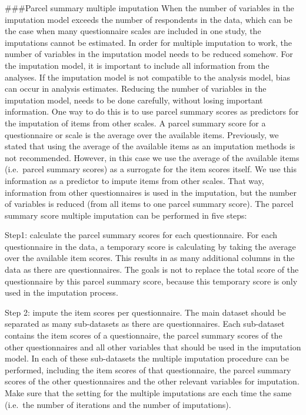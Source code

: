 \documentclass[
]{book}
\begin{document}
\#\#\#Parcel summary multiple imputation
When the number of variables in the imputation model exceeds the number of respondents in the data, which can be the case when many questionnaire scales are included in one study, the imputations cannot be estimated. In order for multiple imputation to work, the number of variables in the imputation model needs to be reduced somehow. For the imputation model, it is important to include all information from the analyses. If the imputation model is not compatible to the analysis model, bias can occur in analysis estimates. Reducing the number of variables in the imputation model, needs to be done carefully, without losing important information. One way to do this is to use parcel summary scores as predictors for the imputation of items from other scales. A parcel summary score for a questionnaire or scale is the average over the available items. Previously, we stated that using the average of the available items as an imputation methods is not recommended. However, in this case we use the average of the available items (i.e.~parcel summary scores) as a surrogate for the item scores itself. We use this information as a predictor to impute items from other scales. That way, information from other questionnaires is used in the imputation, but the number of variables is reduced (from all items to one parcel summary score). The parcel summary score multiple imputation can be performed in five steps:

Step1: calculate the parcel summary scores for each questionnaire. For each questionnaire in the data, a temporary score is calculating by taking the average over the available item scores. This results in as many additional columns in the data as there are questionnaires. The goals is not to replace the total score of the questionnaire by this parcel summary score, because this temporary score is only used in the imputation process.

Step 2: impute the item scores per questionnaire. The main dataset should be separated as many sub-datasets as there are questionnaires. Each sub-dataset contains the item scores of a questionnaire, the parcel summary scores of the other questionnaires and all other variables that should be used in the imputation model. In each of these sub-datasets the multiple imputation procedure can be performed, including the item scores of that questionnaire, the parcel summary scores of the other questionnaires and the other relevant variables for imputation. Make sure that the setting for the multiple imputations are each time the same (i.e.~the number of iterations and the number of imputations).
\end{document}
